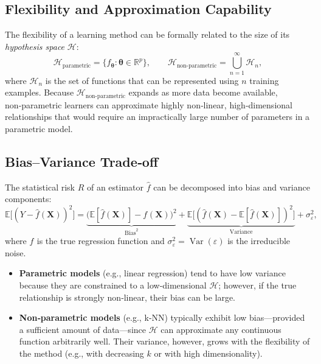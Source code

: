 \documentclass[12pt, a4paper]{article}
\providecommand{\operatorname}[1]{\mathop{\mathrm{#1}}\nolimits}
\begin{document}
\subsection{Flexibility and Approximation Capability}
The flexibility of a learning method can be formally related to the size of its \emph{hypothesis space} \(\mathcal H\):
\[
\mathcal H_{\text{parametric}} = \{f_{\boldsymbol\theta} : \boldsymbol\theta\in\mathbb R^{p}\},\qquad 
\mathcal H_{\text{non‑parametric}} = \bigcup_{n=1}^{\infty}\mathcal H_{n},
\]
where \(\mathcal H_{n}\) is the set of functions that can be represented using \(n\) training examples.  Because \(\mathcal H_{\text{non‑parametric}}\) expands as more data become available, non‑parametric learners can approximate highly non‑linear, high‑dimensional relationships that would require an impractically large number of parameters in a parametric model.

\subsection{Bias–Variance Trade‑off}
The statistical risk \(R\) of an estimator \(\hat f\) can be decomposed into bias and variance components:
\[
\mathbb{E}\!\big[(Y - \hat f(\mathbf{X}))^{2}\big] 
= \underbrace{\big(\mathbb{E}[\hat f(\mathbf{X})]-f^{}(\mathbf{X})\big)^{2}}_{\text{Bias}^{2}}
+ \underbrace{\mathbb{E}\!\big[(\hat f(\mathbf{X})-\mathbb{E}[\hat f(\mathbf{X})])^{2}\big]}_{\text{Variance}}
+ \sigma^{2}_{\varepsilon},
\]
where \(f^{}\) is the true regression function and \(\sigma^{2}_{\varepsilon} = \operatorname{Var}(\varepsilon)\) is the irreducible noise.  

\begin{itemize}
    \item \textbf{Parametric models} (e.g., linear regression) tend to have low variance because they are constrained to a low‑dimensional \(\mathcal H\); however, if the true relationship is strongly non‑linear, their bias can be large.
    \item \textbf{Non‑parametric models} (e.g., k‑NN) typically exhibit low bias—provided a sufficient amount of data—since \(\mathcal H\) can approximate any continuous function arbitrarily well.  Their variance, however, grows with the flexibility of the method (e.g., with decreasing \(k\) or with high dimensionality).
\end{itemize}
\end{document}
